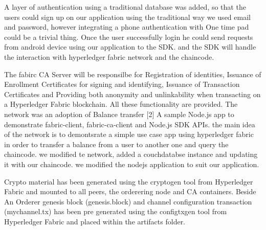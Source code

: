 A layer of authentication using a traditional database was added, so that the users could sign up on our application using the traditional way we used email and password, however integrating a phone authentication with One time pad could be a trivial thing. 
Once the user successfully login he could send requests from android device using our application to the SDK. and the SDK will handle the interaction with hyperledger fabric network and the chaincode. 
 
The fabirc CA Server will be responsilbe for Registration of identities, Issuance of Enrollment Certificates for signing and identifying, Issuance of Transaction Certificates and Providing both anonymity and unlinkability when transacting on a Hyperledger Fabric blockchain. All these functionality are provided.
The network was an adoption of Balance transfer [2] A sample Node.js app to demonstrate fabric-client, fabric-ca-client and Node.js SDK APIs. 
the main idea of the network is to demontsrate a simple use case app using hyperledger fabric in order to transfer a balance from a user to another one and query the chaincode. we modified te network, added a couchdatabse instance and updating it with our chaincode. we modified the nodejs application to suit our application. 

Crypto material has been generated using the cryptogen tool from Hyperledger Fabric and mounted to all peers, the orderering node and CA containers. 
Beside An Orderer genesis block (genesis.block) and channel configuration transaction (mychannel.tx) has been pre generated using the configtxgen tool from Hyperledger Fabric and placed within the artifacts folder. 



\section{} 


 



 
  